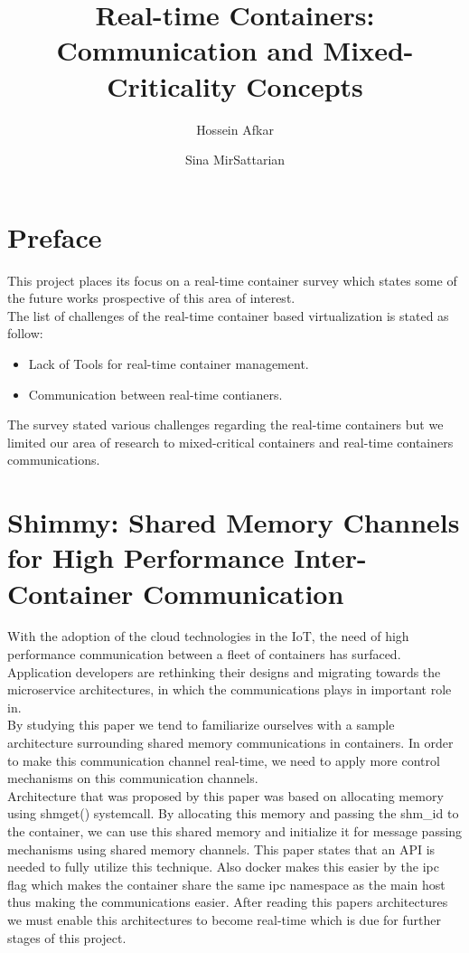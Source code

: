 \documentclass[a4paper, 10pt]{article}
\title{Real-time Containers: Communication and Mixed-Criticality Concepts}
\author{Hossein Afkar \and Sina MirSattarian}
\theoremstyle{nonumberplain}
\begin{document}
\maketitle

\section{Preface}
This project places its focus on a real-time container survey which states
some of the future works prospective of this area of interest. \\
The list of challenges of the real-time container based virtualization is
stated as follow:
\begin{itemize}
    \item Lack of Tools for real-time container management.
    \item Communication between real-time contianers.
\end{itemize}
The survey stated various challenges regarding the real-time containers but we
limited our area of research to mixed-critical containers and real-time
containers communications.

\section{Shimmy: Shared Memory Channels for High Performance Inter-Container
Communication}
With the adoption of the cloud technologies in the IoT, the need of
high performance communication between a fleet of containers has surfaced. \\
Application developers are rethinking their designs and migrating
towards the microservice architectures, in which the communications plays
in important role in. \\
By studying this paper we tend to familiarize ourselves with a sample
architecture surrounding shared memory communications in containers. In order 
to make this communication channel real-time, we need to apply more control
mechanisms on this communication channels. \\
Architecture that was proposed by this paper was based on allocating memory
using shmget() systemcall. By allocating this memory and passing the shm\_id
to the container, we can use this shared memory and initialize it for message
passing mechanisms using shared memory channels. This paper states that an API
is needed to fully utilize this technique. Also docker makes this easier by 
the ipc flag which makes the container share the same ipc namespace as the main
host thus making the communications easier. After reading this papers
architectures we must enable this architectures to become real-time which is
due for further stages of this project.
\end{document}
